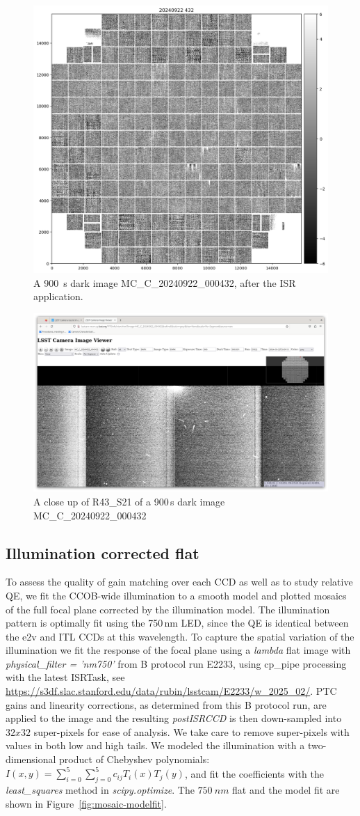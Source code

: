 \begin{figure}
    \centering
    \includegraphics[width=0.5\linewidth]{figures/glowsearch/900sdark.png}
    \caption{A 900\, s dark image MC\_C\_20240922\_000432, after the ISR application.}
    \label{fig:glowsearch}
\end{figure}
\begin{figure}
    \centering
    \includegraphics[width=0.5\linewidth]{figures/glowsearch/R43S21.png}
    \caption{A close up of R43\_S21 of a 900\,s dark image MC\_C\_20240922\_000432}
    \label{fig:glowsearch:closeup}
\end{figure}

\clearpage
\subsection{Illumination corrected flat}

To assess the quality of gain matching over each CCD as well as to study relative QE, we fit the CCOB-wide illumination to a smooth model and plotted mosaics of the full focal plane corrected by the illumination model. The illumination pattern is optimally fit using the 750\,nm LED, since the QE is identical between the e2v and ITL CCDs at this wavelength. To capture the spatial variation of the illumination we fit the response of the focal plane using a {\it lambda} flat image with {\it physical\_filter = 'nm750'} from B protocol run E2233, using cp\_pipe processing with the latest ISRTask, see  \url{https://s3df.slac.stanford.edu/data/rubin/lsstcam/E2233/w_2025_02/}. PTC gains and linearity corrections, as determined from this B protocol run, are applied to the image and the resulting {\it postISRCCD} is then down-sampled into $32x32$ super-pixels for ease of analysis. We take care to remove super-pixels with values in both low and high tails.  We modeled the illumination with a two-dimensional product of Chebyshev polynomials: $ I(x,y) = \sum_{i=0}^{5} \sum_{j=0}^{5} c_{ij} T_i(x) T_j(y)$, and fit the coefficients with the {\it least\_squares} method in {\it scipy.optimize}.  The $750~nm$ flat and the model fit are shown in Figure~\ref{fig:mosaic-modelfit}.

